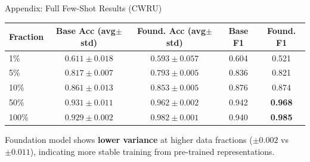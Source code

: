 \documentclass[aspectratio=169, 11pt]{beamer}
\begin{document}
\begin{frame}{Appendix: Full Few-Shot Results (CWRU)}
\begin{table}
\centering
\small
\begin{tabular}{@{}l cc cc@{}}
\toprule
\textbf{Fraction} & \textbf{Base Acc (avg$\pm$std)} & \textbf{Found. Acc (avg$\pm$std)} & \textbf{Base F1} & \textbf{Found. F1} \\
\midrule
1\%   & $0.611 \pm 0.018$ & $0.593 \pm 0.057$ & 0.604 & 0.521 \\
5\%   & $0.817 \pm 0.007$ & $0.793 \pm 0.005$ & 0.836 & 0.821 \\
10\%  & $0.861 \pm 0.013$ & $0.853 \pm 0.005$ & 0.876 & 0.874 \\
50\%  & $0.931 \pm 0.011$ & $\mathbf{0.962 \pm 0.002}$ & 0.942 & \textbf{0.968} \\
100\% & $0.929 \pm 0.002$ & $\mathbf{0.982 \pm 0.001}$ & 0.940 & \textbf{0.985} \\
\bottomrule
\end{tabular}
\end{table}

\vspace{0.3cm}
Foundation model shows \textbf{lower variance} at higher data fractions ($\pm 0.002$ vs $\pm 0.011$), indicating more stable training from pre-trained representations.
\end{frame}
\end{document}
